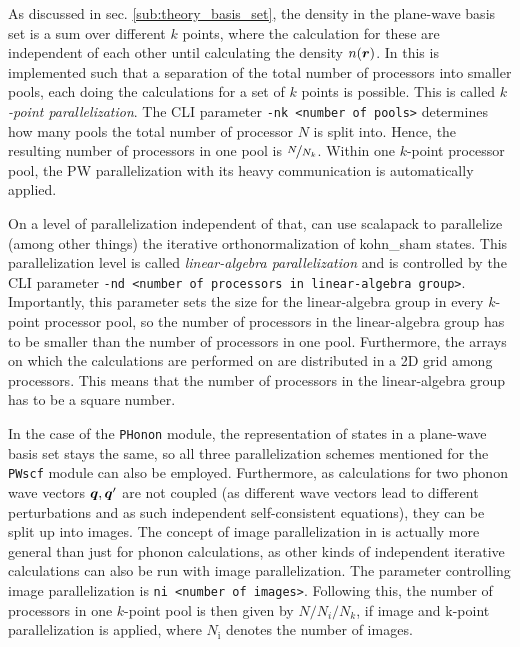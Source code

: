\documentclass[main.tex]{subfiles}
\begin{document}
As discussed in sec. \ref{sub:theory_basis_set}, the density in the plane-wave basis set is a sum over different \(k\) points, where the calculation for these are independent of each other until calculating the density \(n( \vb*{r})\).
In \QE this is implemented such that a separation of the total number of processors into smaller pools, each doing the calculations for a set of \(k\) points is possible.
This is called \emph{\(k\)-point parallelization}.
The CLI parameter \texttt{-nk <number of pools>} determines how many pools the total number of processor \(N\) is split into.
Hence, the resulting number of processors in one pool is \(\nicefrac{N}{N_k}\).
Within one \(k\)-point processor pool, the PW parallelization with its heavy communication is automatically applied.

On a level of parallelization independent of that, \QE can use \gls{scalapack} to parallelize (among other things) the iterative orthonormalization of \acrshort{kohn_sham} states.
This parallelization level is called \emph{linear-algebra parallelization} and is controlled by the CLI parameter \texttt{-nd <number of processors in linear-algebra group>}.
Importantly, this parameter sets the size for the linear-algebra group in every \(k\)-point processor pool, so the number of processors in the linear-algebra group has to be smaller than the number of processors in one pool.
Furthermore, the arrays on which the calculations are performed on are distributed in a 2D grid among processors.
This means that the number of processors in the linear-algebra group has to be a square number.

In the case of the \texttt{PHonon} module, the representation of states in a plane-wave basis set stays the same, so all three parallelization schemes mentioned for the \texttt{PWscf} module can also be employed.
Furthermore, as calculations for two phonon wave vectors \(\vb*{q}, \vb*{q}^{\prime}\) are not coupled (as different wave vectors lead to different perturbations and as such independent self-consistent equations), they can be split up into images.
The concept of image parallelization in \QE is actually more general than just for phonon calculations, as other kinds of independent iterative calculations can also be run with image parallelization.
The parameter controlling image parallelization is \texttt{ni <number of images>}.
Following this, the number of processors in one \(k\)-point pool is then given by \(N / N_i / N_k\), if image and k-point parallelization is applied, where \(N_\mathrm{i}\) denotes the number of images.
\end{document}
